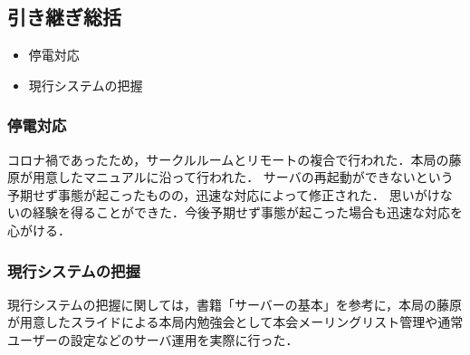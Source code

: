 \subsection*{引き継ぎ総括}


\begin{itemize}
	\item 停電対応
	\item 現行システムの把握
\end{itemize}

\subsubsection*{停電対応}
コロナ禍であったため，サークルルームとリモートの複合で行われた．本局の藤原が用意したマニュアルに沿って行われた．
サーバの再起動ができないという予期せず事態が起こったものの，迅速な対応によって修正された．
思いがけないの経験を得ることができた．今後予期せず事態が起こった場合も迅速な対応を心がける．

\subsubsection*{現行システムの把握}
現行システムの把握に関しては，書籍「サーバーの基本」を参考に，本局の藤原が用意したスライドによる本局内勉強会として本会メーリングリスト管理や通常ユーザーの設定などのサーバ運用を実際に行った．

